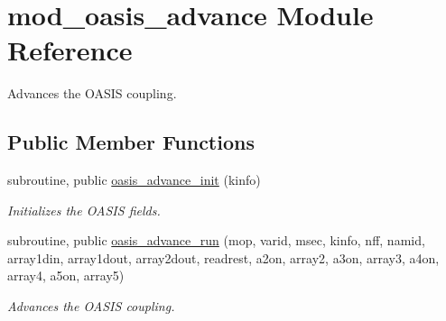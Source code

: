 \hypertarget{classmod__oasis__advance}{\section{mod\+\_\+oasis\+\_\+advance Module Reference}
\label{classmod__oasis__advance}
}


Advances the O\+A\+S\+I\+S coupling.  


\subsection*{Public Member Functions}
\begin{DoxyCompactItemize}
\item 
subroutine, public \hyperlink{classmod__oasis__advance_a480bfe5b333300c1084af8f9c239a81d}{oasis\+\_\+advance\+\_\+init} (kinfo)
\begin{DoxyCompactList}\small\item\em Initializes the O\+A\+S\+I\+S fields. \end{DoxyCompactList}\item 
subroutine, public \hyperlink{classmod__oasis__advance_acd7e5c23cf8f8b5fa7fe3cc59768cb09}{oasis\+\_\+advance\+\_\+run} (mop, varid, msec, kinfo, nff, namid, array1din, array1dout, array2dout, readrest, a2on, array2, a3on, array3, a4on, array4, a5on, array5)
\begin{DoxyCompactList}\small\item\em Advances the O\+A\+S\+I\+S coupling. \end{DoxyCompactList}\end{DoxyCompactItemize}
